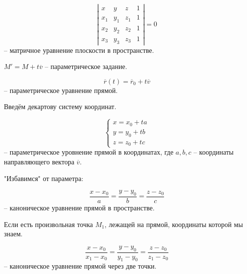 	\begin{Def}
		$$\left|\begin{array}{cccc}
			x & y & z & 1 \\ 
			x_1 & y_1 & z_1 & 1 \\
			x_2 & y_2 & z_2 & 1 \\
			x_3 & y_3 & z_3 & 1 
			\end{array}\right| = 0$$ -- матричное уравнение плоскости в пространстве.
	\end{Def}

	\Pagebreak

	\begin{Def}
		$M' = M + t \overline{v}$ -- параметрическое задание. 
	\end{Def}
	
	\begin{Def}
		$$\overline{r}(t) = \overline{r}_0 + t \overline{v}$$ -- параметрическое уравнение прямой.
	\end{Def}

	Введём декартову систему координат.

	\begin{figure*}[h]
		\centering
		\def\svgwidth{0.25\columnwidth}
		
	\end{figure*}

	\begin{Def}
		$$ \begin{cases}
			x = x_0 + ta\\
			y = y_0 + tb \\
			z = z_0 + tc
		\end{cases} $$ -- параметрическое уровнение прямой в координатах, где $a, b, c$ -- координаты направляющего вектора $\overline{v}$.
	\end{Def}

	"Избавимся" от параметра: 
	\begin{Def}
		$$\frac{x - x_0}{a} = \frac{y - y_0}{b} = \frac{z - z_0}{c}$$ -- каноническое уравнение прямой в пространстве.
	\end{Def}
	
	Если есть произвольная точка $M_1$, лежащей на прямой, координаты которой мы знаем.

	\begin{Def}
		$$\frac{x - x_0}{x_1 - x_0} = \frac{y - y_0}{y_1 - y_0} = \frac{z - z_0}{z_1 - z_0}$$ -- каноническое уравнение прямой через две точки.
	\end{Def}

